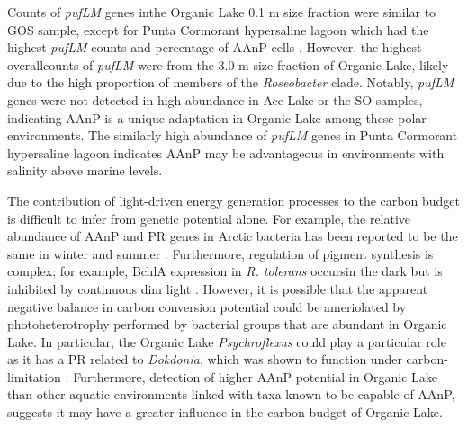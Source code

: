 Counts of \emph{pufLM} genes inthe Organic Lake 0.1 \textmu{}m size fraction were similar to \ac{GOS} sample, except for Punta Cormorant hypersaline lagoon which had the highest \emph{pufLM} counts and percentage of \ac{AAnP} cells . 
However, the highest overallcounts of \emph{pufLM} were from the 3.0 \textmu{}m size fraction of Organic Lake, likely due to the high proportion of members of the \emph{Roseobacter} clade. 
Notably, \emph{pufLM} genes were not detected in high abundance in Ace Lake or the \ac{SO} samples, indicating \ac{AAnP} is a unique adaptation in Organic Lake among these polar environments. 
The similarly high abundance of \emph{pufLM} genes in Punta Cormorant hypersaline lagoon indicates \ac{AAnP} may be advantageous in environments with salinity above marine levels.

The contribution of light-driven energy generation processes to the carbon budget is difficult to infer from genetic potential alone. 
For example, the relative abundance of \ac{AAnP} and \ac{PR} genes in Arctic bacteria has been reported to be the same in winter and summer \cite{Cottrell2009}. 
Furthermore, regulation of pigment synthesis is complex; for example, \ac{BchlA} expression in \emph{R. tolerans} occursin the dark but is inhibited by continuous dim light \cite{Labrenz1999}. 
However, it is possible that the apparent negative balance in carbon conversion potential could be ameriolated by photoheterotrophy performed by bacterial groups that are abundant in Organic Lake. 
In particular, the Organic Lake \emph{Psychroflexus} could play a particular role as it has a \ac{PR} related to \emph{Dokdonia}, which was shown to function under carbon-limitation \cite{Gomez-Consarnau2007}.
Furthermore, detection of higher \ac{AAnP} potential in Organic Lake than other aquatic environments linked with taxa known to be capable of \ac{AAnP}, suggests it may have a greater influence in the carbon budget of Organic Lake.

